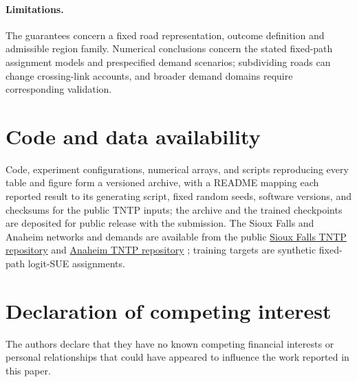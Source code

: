 \documentclass[a4paper,fleqn]{cas-sc}
\begin{document}
\paragraph{Limitations.}
The guarantees concern a fixed road representation, outcome definition
and admissible region family. Numerical conclusions concern the stated
fixed-path assignment models and prespecified demand scenarios;
subdividing roads can change crossing-link accounts, and broader demand
domains require corresponding validation.

\section*{Code and data availability}
Code, experiment configurations, numerical arrays, and scripts
reproducing every table and figure form a versioned archive, with a
README mapping each reported result to its generating script, fixed
random seeds, software versions, and checksums for the public TNTP
inputs; the archive and the trained checkpoints are deposited for
public release with the submission.
The Sioux Falls and Anaheim networks and demands are available from the public
\href{https://github.com/bstabler/TransportationNetworks/tree/master/SiouxFalls}{Sioux Falls TNTP repository}
and \href{https://github.com/bstabler/TransportationNetworks/tree/master/Anaheim}{Anaheim TNTP repository}
\citep{tnfrc2024transportation}; training targets are synthetic fixed-path
logit-SUE assignments.
\section*{Declaration of competing interest}
The authors declare that they have no known competing financial interests
or personal relationships that could have appeared to influence the work
reported in this paper.
\FloatBarrier

\setlength{\bibsep}{0.8pt plus 0.2pt}

\appendix
{}



\end{document}
